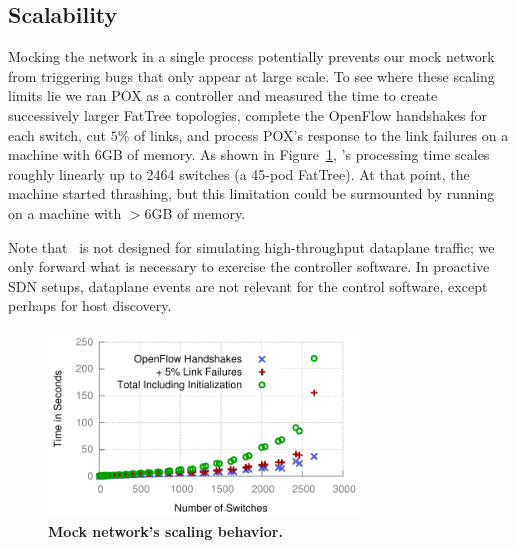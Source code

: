 \subsection{Scalability}
Mocking the network in a single process potentially prevents our mock network from
triggering bugs that only appear at large scale. To see where these scaling
limits lie we ran POX as a controller and measured the
time to create successively larger FatTree
topologies, complete the OpenFlow handshakes for each switch,
cut $5\%$ of links, and process POX's response to the link failures on a machine with 6GB of memory. As shown in
Figure~\ref{fig:scaling}, \projectname's processing time scales roughly
linearly up to 2464 switches (a 45-pod FatTree). At that point, the machine
started thrashing, but this limitation could be surmounted by running on a
machine with $>$6GB of memory.

Note that \projectname~is not designed for simulating high-throughput dataplane
traffic; we only forward what is necessary to exercise the controller
software. In proactive SDN setups, dataplane events are not
relevant for the control software, except perhaps for host discovery.

\begin{figure}[t]
    \includegraphics[width=3.25in]{../graphs/scalability/scaling.pdf}
    \caption[]{\label{fig:scaling}\textbf{Mock network's scaling behavior.}}
\end{figure}

